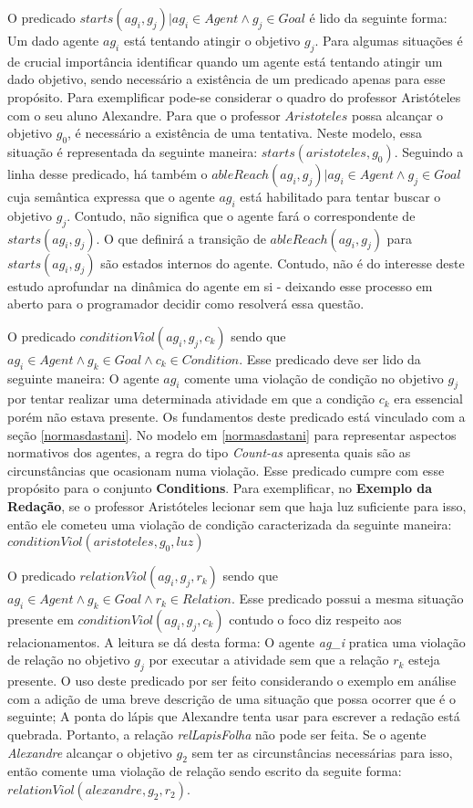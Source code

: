 O predicado $starts(ag_i,g_j) | ag_i \in Agent \wedge g_j \in Goal $ é lido da seguinte forma: Um dado agente $ag_i$ está tentando atingir o objetivo $g_j$. Para algumas situações é de crucial importância identificar quando um agente está tentando atingir um dado objetivo, sendo necessário a existência de um predicado apenas para esse propósito. Para exemplificar pode-se considerar o quadro do professor Aristóteles com o seu aluno Alexandre. Para que o professor $Aristoteles$ possa alcançar o objetivo $g_0$, é necessário a existência de uma tentativa. Neste modelo, essa situação é representada da seguinte maneira: $starts(aristoteles,g_0)$. Seguindo a linha desse predicado, há também o $ableReach(ag_i,g_j) | ag_i \in Agent \wedge g_j \in Goal$ cuja semântica expressa que o agente $ag_i$ está habilitado para tentar buscar o objetivo $g_j$. Contudo, não significa que o agente fará o correspondente de $starts(ag_i,g_j)$. O que definirá a transição de $ableReach(ag_i,g_j)$ para $starts(ag_i,g_j)$ são estados internos do agente. Contudo, não é do interesse deste estudo aprofundar na dinâmica do agente em si - deixando esse processo em aberto para o programador decidir como resolverá essa questão.

O predicado $ conditionViol(ag_i,g_j,c_k) $ sendo que $ ag_i \in Agent \wedge g_k \in Goal \wedge c_k \in Condition$. Esse predicado deve ser lido da seguinte maneira: O agente $ag_i$ comente uma violação de condição no objetivo $g_j$ por tentar realizar uma determinada atividade em que a condição $c_k$ era essencial porém não estava presente. Os fundamentos deste predicado está vinculado com a seção \ref{normasdastani}. No modelo em \ref{normasdastani} para representar aspectos normativos dos agentes, a regra do tipo \textit{Count-as} apresenta quais são as circunstâncias que ocasionam numa violação. Esse predicado cumpre com esse propósito para o conjunto \textbf{Conditions}. Para exemplificar, no \textbf{Exemplo da Redação}, se o professor Aristóteles lecionar sem que haja luz suficiente para isso, então ele cometeu uma violação de condição caracterizada da seguinte maneira: $conditionViol(aristoteles,g_0,luz)$

O predicado $ relationViol(ag_i,g_j,r_k) $ sendo que $ ag_i \in Agent \wedge g_k \in Goal \wedge r_k \in Relation $. Esse predicado possui a mesma situação presente em $ conditionViol(ag_i,g_j,c_k) $ contudo o foco diz respeito aos relacionamentos. A leitura se dá desta forma: O agente \textit{ag\_i} pratica uma violação de relação no objetivo $g_j$ por executar a atividade sem que a relação $r_k$ esteja presente. O uso deste predicado por ser feito considerando o exemplo em análise com a adição de uma breve descrição de uma situação que possa ocorrer que é o seguinte; A ponta do lápis que Alexandre tenta usar para escrever a redação está quebrada. Portanto, a relação \textit{relLapisFolha} não pode ser feita. Se o agente \textit{Alexandre} alcançar o objetivo $g_2$ sem ter as circunstâncias necessárias para isso, então comente uma violação de relação sendo escrito da seguite forma: $relationViol(alexandre,g_2,r_2)$.

